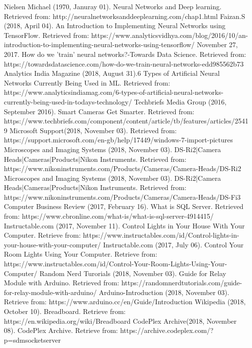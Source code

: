 \documentclass[onecolumn, draftclsnofoot,10pt, compsoc]{IEEEtran}
\begin{document}
\begin{thebibliography}{15}
Nielsen Michael (1970, Januray 01). Neural Networks and Deep learning. Retrieved from: http://neuralnetworksanddeeplearning.com/chap1.html
Faizan.S (2018, April 04). An Introduction to Implementing Neural Networks using TensorFlow. Retrieved from: https://www.analyticsvidhya.com/blog/2016/10/an-introduction-to-implementing-neural-networks-using-tensorflow/
November 27, 2017. How do we 'train' neural networks?-Towards Data Science. Retrieved from: https://towardsdatascience.com/how-do-we-train-neural-networks-edd985562b73
Analytics India Magazine (2018, August 31).6 Types of Artificial Neural Networks Currently Being Used in ML. Retrieved from: https://www.analyticsindiamag.com/6-types-of-artificial-neural-networks-currently-being-used-in-todays-technology/
Techbriefs Media Group (2016, September 2016). Smart Cameras Get Smarter. Retrieved from: https://www.techbriefs.com/component/content/article/tb/features/articles/25419
Microsoft Support(2018, November 03). Retrieved from: https://support.microsoft.com/en-gb/help/17449/windows-7-import-pictures
Microscopes and Imaging Systems (2018, November 03). DS-Ri2|Camera Heads|Cameras|Products|Nikon Instruments. Retrieved from: https://www.nikoninstruments.com/Products/Cameras/Camera-Heads/DS-Ri2
Microscopes and Imaging Systems (2018, November 03). DS-Ri2|Camera Heads|Cameras|Products|Nikon Instruments. Retrieved from: https://www.nikoninstruments.com/Products/Cameras/Camera-Heads/DS-Fi3
Computer Business Review (2017, February 16). What is SQL Server. Retrieved from: https://www.cbronline.com/what-is/what-is-sql-server-4914415/
Instructable.com (2017, November 11). Control Lights in Your House With Your Computer. Retrieve from: https://www.instructables.com/id/Control-lights-in-your-house-with-your-computer/
Instructable.com (2017, July 06). Control Your Room Lights Using Your Computer. Retrieve from: https://www.instructables.com/id/Control-Your-Room-Lights-Using-Your-Computer/
Random Nerd Turorials (2018, November 03). Guide for Relay Module with Arduino. Retrieved from: https://randomnerdtutorials.com/guide-for-relay-module-with-arduino/
Arduino-Introduction (2018, November 03). Retrieve from: https://www.arduino.cc/en/Guide/Introduction
Wikipedia (2018, October 10). Breadboard. Retrieve from:
https://en.wikipedia.org/wiki/Breadboard
CodePlex Archive(2018, November 08). CodePlex Archive. Retrieve from: https://archive.codeplex.com/?p=sdmsocketserver
\end{thebibliography}
\end{document}
